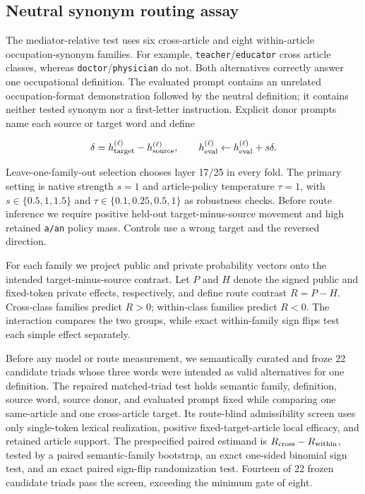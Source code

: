 \documentclass[
]{article}
\begin{document}
\subsection{Neutral synonym routing
assay}\label{neutral-synonym-routing-assay}

The mediator-relative test uses six cross-article and eight
within-article occupation-synonym families. For example,
\texttt{teacher}/\texttt{educator} cross article classes, whereas
\texttt{doctor}/\texttt{physician} do not. Both alternatives correctly
answer one occupational definition. The evaluated prompt contains an
unrelated occupation-format demonstration followed by the neutral
definition; it contains neither tested synonym nor a first-letter
instruction. Explicit donor prompts name each source or target word and
define

\[
\delta=h_{\rm target}^{(\ell)}-h_{\rm source}^{(\ell)},\qquad
h_{\rm eval}^{(\ell)}\leftarrow h_{\rm eval}^{(\ell)}+s\delta.
\]

Leave-one-family-out selection chooses layer 17/25 in every fold. The
primary setting is native strength \(s=1\) and article-policy
temperature \(\tau=1\), with \(s\in\{0.5,1,1.5\}\) and
\(\tau\in\{0.1,0.25,0.5,1\}\) as robustness checks. Before route
inference we require positive held-out target-minus-source movement and
high retained \texttt{a/an} policy mass. Controls use a wrong target and
the reversed direction.

For each family we project public and private probability vectors onto
the intended target-minus-source contrast. Let \(P\) and \(H\) denote
the signed public and fixed-token private effects, respectively, and
define route contrast \(R=P-H\). Cross-class families predict \(R>0\);
within-class families predict \(R<0\). The interaction compares the two
groups, while exact within-family sign flips test each simple effect
separately.

Before any model or route measurement, we semantically curated and froze
22 candidate triads whose three words were intended as valid
alternatives for one definition. The repaired matched-triad test holds
semantic family, definition, source word, source donor, and evaluated
prompt fixed while comparing one same-article and one cross-article
target. Its route-blind admissibility screen uses only single-token
lexical realization, positive fixed-target-article local efficacy, and
retained article support. The prespecified paired estimand is
\(R_{\rm cross}-R_{\rm within}\), tested by a paired semantic-family
bootstrap, an exact one-sided binomial sign test, and an exact paired
sign-flip randomization test. Fourteen of 22 frozen candidate triads
pass the screen, exceeding the minimum gate of eight.
\end{document}
